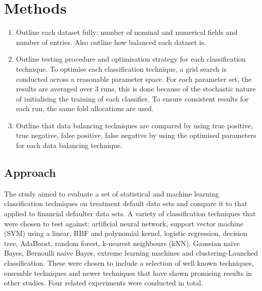 \documentclass{sig-alternate-05-2015}
\begin{document}
	\section{Methods}
	\begin{enumerate}
		\item Outline each dataset fully: number of nominal and numerical fields and number of entries. Also outline how balanced each dataset is.
		\item Outline testing procedure and optimisation strategy for each classification technique. To optimise each classification technique, a grid search is conducted across a reasonable parameter space. For each parameter set, the results are averaged over 3 runs, this is done because of the stochastic nature of initialising the training of each classifier. To ensure consistent results for each run, the same fold allocations are used.
		\item Outline that data balancing techniques are compared by using true positive, true negative, false positive, false negative by using the optimised parameters for each data balancing technique. 
		
	\end{enumerate}
	\subsection{Approach}
	The study aimed to evaluate a set of statistical and machine learning classification techniques on treatment default data sets and compare it to that applied to financial defaulter data sets. A variety of classification techniques that were chosen to test against: artificial neural network, support vector machine (SVM) using a linear, RBF and polynomial kernel, logistic regression, decision tree, AdaBoost, random forest, k-nearest neighbours (kNN), Gaussian naive Bayes, Bernoulli naive Bayes, extreme learning machines and clustering-Launched classification. These were chosen to include a selection of well known techniques, ensemble techniques and newer techniques that have shown promising results in other studies. Four related experiments were conducted in total.
	
\end{document}
